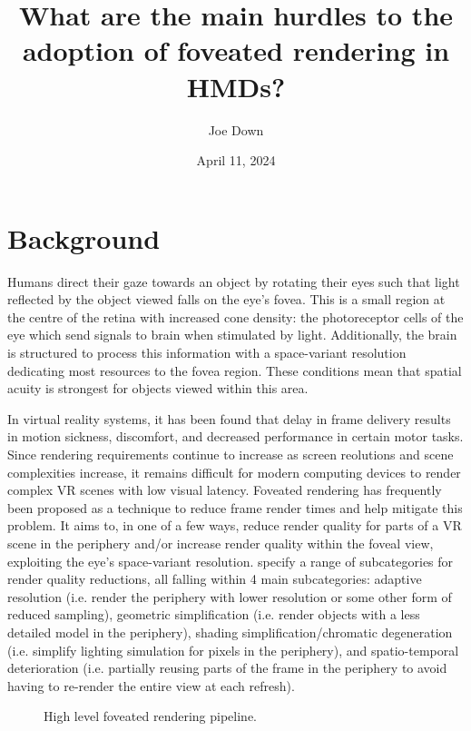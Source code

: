 \documentclass[a4paper,11pt]{article}
\title{What are the main hurdles to the adoption of foveated rendering in HMDs?}
\author{Joe Down}
\date{April 11, 2024}
\begin{document}
\maketitle

\section{Background}
Humans direct their gaze towards an object by rotating their eyes such that light reflected by the object viewed falls on the eye's fovea\cite{levoy1990gaze}. This is a small region at the centre of the retina with increased cone density\cite{pumphrey1948theory}: the photoreceptor cells of the eye which send signals to brain when stimulated by light\cite{arendt2003evolution}. Additionally, the brain is structured to process this information with a space-variant resolution dedicating most resources to the fovea region\cite{weber2009implementations}. These conditions mean that spatial acuity is strongest for objects viewed within this area\cite{levoy1990gaze}.

In virtual reality systems, it has been found that delay in frame delivery results in motion sickness, discomfort\cite{waltemate2016impact}, and decreased performance in certain motor tasks\cite{raaen2015measuring}. Since rendering requirements continue to increase as screen reolutions and scene complexities increase, it remains difficult for modern computing devices to render complex VR scenes with low visual latency\cite{wang2023foveated}. Foveated rendering has frequently been proposed as a technique to reduce frame render times and help mitigate this problem. It aims to, in one of a few ways, reduce render quality for parts of a VR scene in the periphery and/or increase render quality within the foveal view\cite{weier2016foveated}, exploiting the eye's space-variant resolution. \textcite{mohanto2022integrative} specify a range of subcategories for render quality reductions, all falling within 4 main subcategories: adaptive resolution (i.e. render the periphery with lower resolution or some other form of reduced sampling), geometric simplification (i.e. render objects with a less detailed model in the periphery), shading simplification/chromatic degeneration (i.e. simplify lighting simulation for pixels in the periphery), and spatio-temporal deterioration (i.e. partially reusing parts of the frame in the periphery to avoid having to re-render the entire view at each refresh).

\begin{figure}
  \begin{center}
    
    \caption{High level foveated rendering pipeline.}
    \label{fig:pipeline}
  \end{center}
\end{figure}
\end{document}
